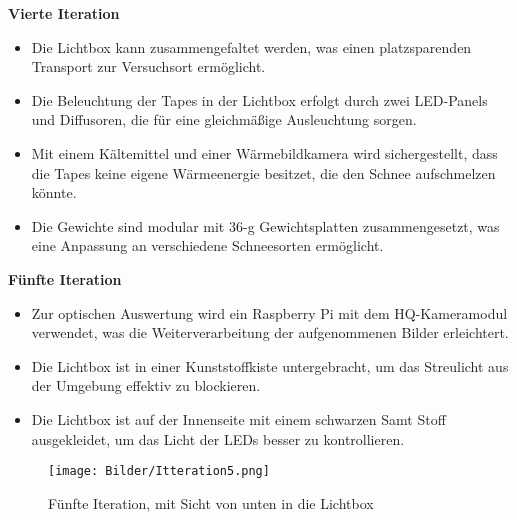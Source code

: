 \textbf{Vierte Iteration}

\begin{itemize}
    \item Die Lichtbox kann zusammengefaltet werden, was einen platzsparenden Transport zur Versuchsort ermöglicht.
    \item Die Beleuchtung der Tapes in der Lichtbox erfolgt durch zwei LED-Panels und Diffusoren, die für eine gleichmäßige Ausleuchtung sorgen.
    \item Mit einem Kältemittel und einer Wärmebildkamera wird sichergestellt, dass die Tapes keine eigene Wärmeenergie besitzet, die den Schnee aufschmelzen könnte.
    \item Die Gewichte sind modular mit 36-g Gewichtsplatten zusammengesetzt, was eine Anpassung an verschiedene Schneesorten ermöglicht.
\end{itemize}

\textbf{Fünfte Iteration}
\label{sec:funfItt}
\begin{itemize}
    \item Zur optischen Auswertung wird ein Raspberry Pi mit dem HQ-Kameramodul verwendet, was die Weiterverarbeitung der aufgenommenen Bilder erleichtert.
    \item Die Lichtbox ist in einer Kunststoffkiste untergebracht, um das Streulicht aus der Umgebung effektiv zu blockieren.
      \item Die Lichtbox ist auf der Innenseite mit einem schwarzen Samt Stoff ausgekleidet, um das Licht der LEDs besser zu kontrollieren.
\end{itemize}


\begin{figure}
    \centering
    \texttt{[image: Bilder/Itteration5.png]}
    \caption{Fünfte Iteration, mit Sicht von unten in die Lichtbox}
    \label{fig:funfItter}
\end{figure}
